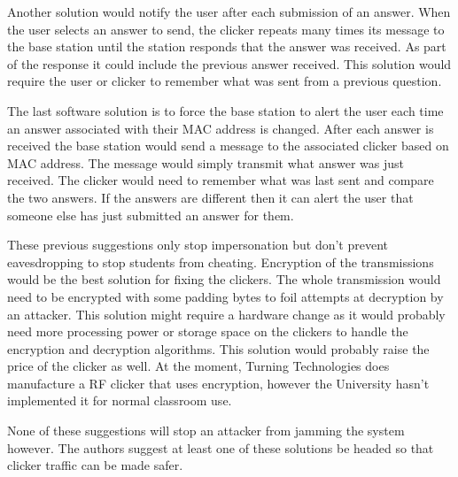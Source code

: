 Another solution would notify the user after each submission of an answer. When the user selects an answer to send, the clicker repeats many times its message to the base station until the station responds that the answer was received.  As part of the response it could include the previous answer received.  This solution would require the user or clicker to remember what was sent from a previous question.

The last software solution is to force the base station to alert the user each time an answer associated with their MAC address is changed.  After each answer is received the base station would send a message to the associated clicker based on MAC address.  The message would simply transmit what answer was just received.  The clicker would need to remember what was last sent and compare the two answers.  If the answers are different then it can alert the user that someone else has just submitted an answer for them.

These previous suggestions only stop impersonation but don't prevent eavesdropping to stop students from cheating.  Encryption of the transmissions would be the best solution for fixing the clickers.  The whole transmission would need to be encrypted with some padding bytes to foil attempts at decryption by an attacker.   This solution might require a hardware change as it would probably need more processing power or storage space on the clickers to handle the encryption and decryption algorithms.  This solution would probably raise the price of the clicker as well.  At the moment, Turning Technologies does manufacture a RF clicker that uses encryption, however the University hasn't implemented it for normal classroom use.

None of these suggestions will stop an attacker from jamming the system however.  The authors suggest at least one of these solutions be headed so that clicker traffic can be made safer.


